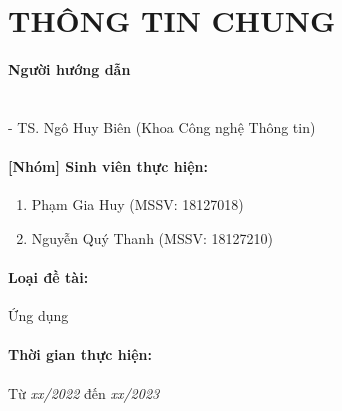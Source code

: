 \newpage

\section{THÔNG TIN CHUNG}

\paragraph{Người hướng dẫn}\mbox{}\\


- TS. Ngô Huy Biên (Khoa Công nghệ Thông tin)    

\paragraph{[Nhóm] Sinh viên thực hiện:}
\begin{enumerate}
    \item Phạm Gia Huy (MSSV: 18127018)
    \item Nguyễn Quý Thanh (MSSV: 18127210)
\end{enumerate}

\paragraph{Loại đề tài:}
Ứng dụng

\paragraph{Thời gian thực hiện:}
Từ \textsl{xx/2022} đến \textsl{xx/2023}
